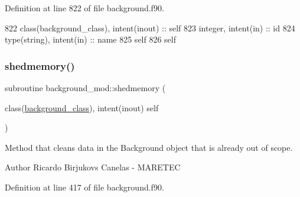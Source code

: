 Definition at line 822 of file background.\+f90.


\begin{DoxyCode}
822     \textcolor{keywordtype}{class}(background\_class), \textcolor{keywordtype}{intent(inout)} :: self
823     \textcolor{keywordtype}{integer}, \textcolor{keywordtype}{intent(in)} :: id
824     \textcolor{keywordtype}{type}(string), \textcolor{keywordtype}{intent(in)} :: name
825     self%
826     self%
\end{DoxyCode}
\mbox{\label{namespacebackground__mod_a2c75c9011305adad2f19fc2233df700d}} 
\subsubsection{\texorpdfstring{shedmemory()}{shedmemory()}}
{\footnotesize\ttfamily subroutine background\+\_\+mod\+::shedmemory (\begin{DoxyParamCaption}\item[{class(\mbox{\hyperlink{structbackground__mod_1_1background__class}{background\+\_\+class}}), intent(inout)}]{self }\end{DoxyParamCaption})\hspace{0.3cm}{\ttfamily [private]}}



Method that cleans data in the Background object that is already out of scope. 

\begin{DoxyAuthor}{Author}
Ricardo Birjukovs Canelas -\/ M\+A\+R\+E\+T\+EC 
\end{DoxyAuthor}


Definition at line 417 of file background.\+f90.


